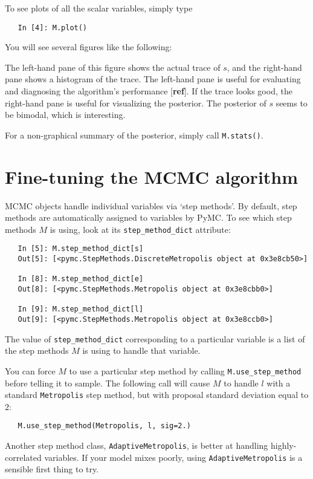 To see plots of all the scalar variables, simply type 
\begin{verbatim}
   In [4]: M.plot()
\end{verbatim}
You will see several figures like the following:
\begin{center}
\end{center}
The left-hand pane of this figure shows the actual trace of $s$, and the right-hand pane shows a histogram of the trace. The left-hand pane is useful for evaluating and diagnosing the algorithm's performance [\textbf{ref}]. If the trace looks good, the right-hand pane is useful for visualizing the posterior. The posterior of $s$ seems to be bimodal, which is interesting.

For a non-graphical summary of the posterior, simply call \texttt{M.stats()}.


\section*{Fine-tuning the MCMC algorithm} 

MCMC objects handle individual variables via `step methods'. By default, step methods are automatically assigned to variables by PyMC. To see which step methods $M$ is using, look at its \texttt{step_method_dict} attribute:
\begin{verbatim}
   In [5]: M.step_method_dict[s]
   Out[5]: [<pymc.StepMethods.DiscreteMetropolis object at 0x3e8cb50>]
   
   In [8]: M.step_method_dict[e]
   Out[8]: [<pymc.StepMethods.Metropolis object at 0x3e8cbb0>]

   In [9]: M.step_method_dict[l]
   Out[9]: [<pymc.StepMethods.Metropolis object at 0x3e8ccb0>]
\end{verbatim}
The value of \texttt{step_method_dict} corresponding to a particular variable is a list of the step methods $M$ is using to handle that variable. 

You can force $M$ to use a particular step method by calling \texttt{M.use_step_method} before telling it to sample. The following call will cause $M$ to handle $l$ with a standard \texttt{Metropolis} step method, but with proposal standard deviation equal to $2$:
\begin{verbatim}
   M.use_step_method(Metropolis, l, sig=2.)
\end{verbatim}

Another step method class, \texttt{AdaptiveMetropolis}, is better at handling highly-correlated variables. If your model mixes poorly, using \texttt{AdaptiveMetropolis} is a sensible first thing to try.

